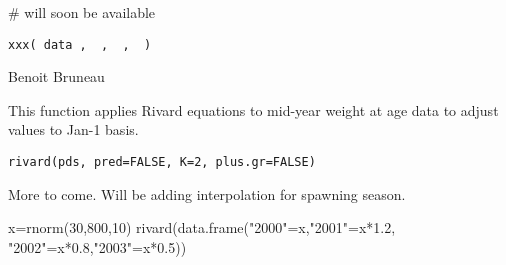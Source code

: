 \documentclass[a4paper]{book}
\begin{document}
%
\begin{Examples}
\begin{ExampleCode}
# will soon be available
\end{ExampleCode}
\end{Examples}
\newpage
{}
%
\begin{Usage}
\begin{verbatim}
xxx( data ,  ,  ,  )
\end{verbatim}
\end{Usage}
%
\begin{Arguments}
\begin{ldescription}
\item[\code{data}] 


\end{ldescription}
\end{Arguments}
%
\begin{Author}\relax
Benoit Bruneau
\end{Author}
\newpage
{}
%
\begin{Description}\relax
This function applies Rivard equations to mid-year weight at age data to adjust values to Jan-1 basis. 
\end{Description}
%
\begin{Usage}
\begin{verbatim}
rivard(pds, pred=FALSE, K=2, plus.gr=FALSE)
\end{verbatim}
\end{Usage}
%
\begin{Arguments}
\begin{ldescription}
\item[\code{data}] 


\end{ldescription}
\end{Arguments}
%
\begin{Details}\relax
More to come.  Will be adding interpolation for spawning season.
\end{Details}
%
\begin{Examples}
\begin{ExampleCode}

x=rnorm(30,800,10)
rivard(data.frame("2000"=x,"2001"=x*1.2, "2002"=x*0.8,"2003"=x*0.5))

\end{ExampleCode}
\end{Examples}
\newpage
{}
\end{document}
